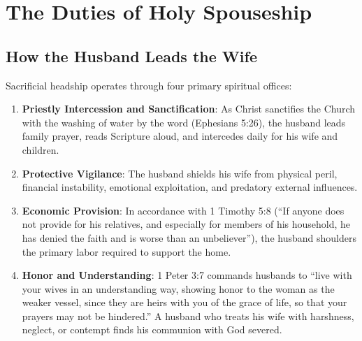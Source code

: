 \documentclass[11pt,twocolumn]{article}
\begin{document}
\section{The Duties of Holy Spouseship}

\subsection{How the Husband Leads the Wife}
Sacrificial headship operates through four primary spiritual offices:
\begin{enumerate}
    \item \textbf{Priestly Intercession and Sanctification}: As Christ sanctifies the Church with the washing of water by the word (Ephesians 5:26), the husband leads family prayer, reads Scripture aloud, and intercedes daily for his wife and children.
    \item \textbf{Protective Vigilance}: The husband shields his wife from physical peril, financial instability, emotional exploitation, and predatory external influences.
    \item \textbf{Economic Provision}: In accordance with 1 Timothy 5:8 (``If anyone does not provide for his relatives, and especially for members of his household, he has denied the faith and is worse than an unbeliever''), the husband shoulders the primary labor required to support the home.
    \item \textbf{Honor and Understanding}: 1 Peter 3:7 commands husbands to ``live with your wives in an understanding way, showing honor to the woman as the weaker vessel, since they are heirs with you of the grace of life, so that your prayers may not be hindered.'' A husband who treats his wife with harshness, neglect, or contempt finds his communion with God severed.
\end{enumerate}
\end{document}
